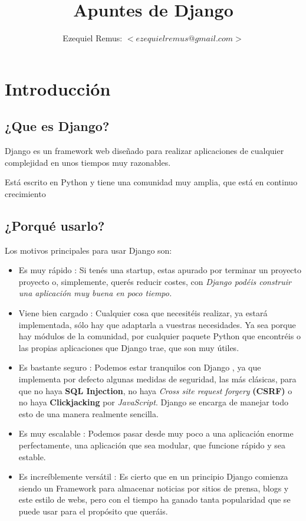 \documentclass[10pt]{article}
\title{\bfseries \huge {Apuntes de Django} }
\author{Ezequiel Remus: $<ezequielremus@gmail.com>$}
\date{}
\newcommand{\py}[1]{{\textcolor{B}{Python} #1}}
\newcommand{\django}[2]{{\textcolor{G}{Django} #2}}
\begin{document}
\renewcommand{\tablename}{Tabla}
\maketitle
\newpage
\tableofcontents
\newpage
\section{Introducción}
\subsection{¿Que es Django?}

\django{} es un framework web diseñado para realizar aplicaciones de cualquier complejidad en unos tiempos muy razonables.

Está escrito en \py{} y tiene una comunidad muy amplia, que está en continuo crecimiento

\subsection{¿Porqué usarlo?}

Los motivos principales para usar \django{} son:
 
\begin{itemize}

\item Es muy rápido : Si tenés una startup, estas apurado por terminar un proyecto proyecto o, simplemente, querés reducir costes, con \textit{\django{} podéis construir una aplicación muy buena en poco tiempo.}
 
 \item Viene bien cargado : Cualquier cosa que necesitéis realizar, ya estará implementada, sólo hay que adaptarla a vuestras necesidades. Ya sea porque hay módulos de la comunidad, por cualquier paquete \py{} que encontréis o las propias aplicaciones que \django{} trae, que son muy útiles.
 
 \item Es bastante seguro : Podemos estar tranquilos con \django{}, ya que implementa por defecto algunas medidas de seguridad, las más clásicas, para que no haya \textbf{SQL Injection}, no haya \textit{Cross site request forgery} \textbf{(CSRF)} o no haya \textbf{Clickjacking} por \textit{JavaScript}. \django{} se encarga de manejar todo esto de una manera realmente sencilla.
 
 \item Es muy escalable : Podemos pasar desde muy poco a una aplicación enorme perfectamente, una aplicación que sea modular, que funcione rápido y sea estable.
 
 \item Es increíblemente versátil : Es cierto que en un principio \django{} comienza siendo un Framework para almacenar noticias por sitios de prensa, blogs y este estilo de webs, pero con el tiempo ha ganado tanta popularidad que se puede usar para el propósito que queráis.
\end{itemize}
\end{document}
